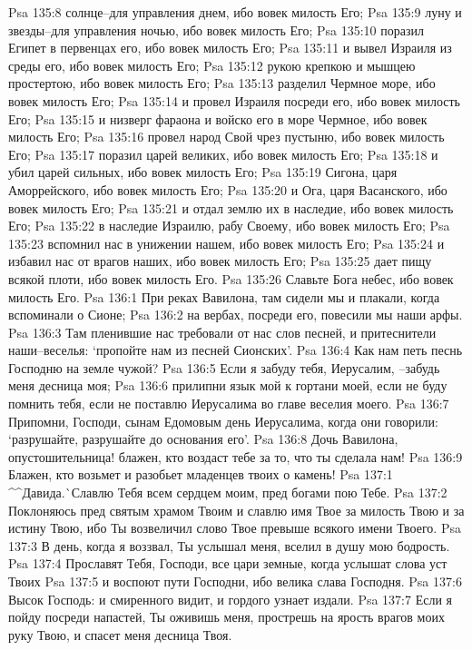 Psa 135:8  солнце--для управления днем, ибо вовек милость Его;
Psa 135:9  луну и звезды--для управления ночью, ибо вовек милость Его;
Psa 135:10  поразил Египет в первенцах его, ибо вовек милость Его;
Psa 135:11  и вывел Израиля из среды его, ибо вовек милость Его;
Psa 135:12  рукою крепкою и мышцею простертою, ибо вовек милость Его;
Psa 135:13  разделил Чермное море, ибо вовек милость Его;
Psa 135:14  и провел Израиля посреди его, ибо вовек милость Его;
Psa 135:15  и низверг фараона и войско его в море Чермное, ибо вовек милость Его;
Psa 135:16  провел народ Свой чрез пустыню, ибо вовек милость Его;
Psa 135:17  поразил царей великих, ибо вовек милость Его;
Psa 135:18  и убил царей сильных, ибо вовек милость Его;
Psa 135:19  Сигона, царя Аморрейского, ибо вовек милость Его;
Psa 135:20  и Ога, царя Васанского, ибо вовек милость Его;
Psa 135:21  и отдал землю их в наследие, ибо вовек милость Его;
Psa 135:22  в наследие Израилю, рабу Своему, ибо вовек милость Его;
Psa 135:23  вспомнил нас в унижении нашем, ибо вовек милость Его;
Psa 135:24  и избавил нас от врагов наших, ибо вовек милость Его;
Psa 135:25  дает пищу всякой плоти, ибо вовек милость Его.
Psa 135:26  Славьте Бога небес, ибо вовек милость Его.
Psa 136:1  При реках Вавилона, там сидели мы и плакали, когда вспоминали о Сионе;
Psa 136:2  на вербах, посреди его, повесили мы наши арфы.
Psa 136:3  Там пленившие нас требовали от нас слов песней, и притеснители наши--веселья: `пропойте нам из песней Сионских'.
Psa 136:4  Как нам петь песнь Господню на земле чужой?
Psa 136:5  Если я забуду тебя, Иерусалим, --забудь меня десница моя;
Psa 136:6  прилипни язык мой к гортани моей, если не буду помнить тебя, если не поставлю Иерусалима во главе веселия моего.
Psa 136:7  Припомни, Господи, сынам Едомовым день Иерусалима, когда они говорили: `разрушайте, разрушайте до основания его'.
Psa 136:8  Дочь Вавилона, опустошительница! блажен, кто воздаст тебе за то, что ты сделала нам!
Psa 136:9  Блажен, кто возьмет и разобьет младенцев твоих о камень!
Psa 137:1  ^^Давида.^^ Славлю Тебя всем сердцем моим, пред богами пою Тебе.
Psa 137:2  Поклоняюсь пред святым храмом Твоим и славлю имя Твое за милость Твою и за истину Твою, ибо Ты возвеличил слово Твое превыше всякого имени Твоего.
Psa 137:3  В день, когда я воззвал, Ты услышал меня, вселил в душу мою бодрость.
Psa 137:4  Прославят Тебя, Господи, все цари земные, когда услышат слова уст Твоих
Psa 137:5  и воспоют пути Господни, ибо велика слава Господня.
Psa 137:6  Высок Господь: и смиренного видит, и гордого узнает издали.
Psa 137:7  Если я пойду посреди напастей, Ты оживишь меня, прострешь на ярость врагов моих руку Твою, и спасет меня десница Твоя.

